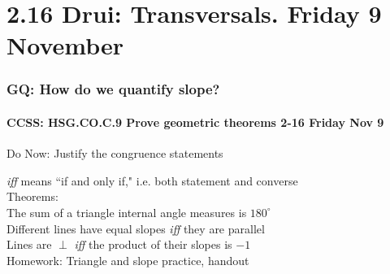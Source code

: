 \documentclass{beamer}
\begin{document}
\section{2.16 Drui: Transversals. Friday 9 November}
  \frame
  {
    \frametitle{GQ: How do we quantify slope?}
    \framesubtitle{CCSS: HSG.CO.C.9 Prove geometric theorems  \alert{2-16 Friday Nov 9}}

    \begin{block}{Do Now: Justify the congruence statements}
    \end{block}
    \emph{iff} means ``if and only if," i.e. both statement and converse\\[0.2cm]
    Theorems: \\
    The sum of a triangle internal angle measures is $180^\circ$ \\
    Different lines have equal slopes \emph{iff} they are parallel\\
    Lines are $\perp$ \emph{iff} the product of their slopes is $-1$\\[0.2cm]
    Homework: Triangle and slope practice, handout
    }
\end{document}
